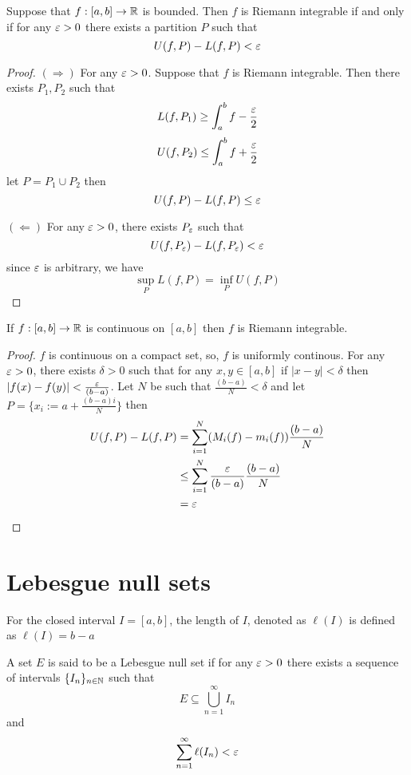 \begin{lemma}
  Suppose that $f: [a, b] \to \mathbb R$ is bounded. Then $f$ is Riemann integrable if and only if for any $\varepsilon > 0$ there exists a partition $P$ such that
  \[U(f, P) - L(f, P) < \varepsilon\]
\end{lemma}

\begin{proof}
  $(\Rightarrow)$ For any $\varepsilon > 0$. Suppose that $f$ is Riemann integrable. Then there exists $P_1, P_2$ such that
  \[L(f, P_1) \ge \int_a^b f - \frac{\varepsilon}{2}\]
  \[U(f, P_2) \le \int_a^b f + \frac{\varepsilon}{2}\]
  let $P = P_1 \cup P_2$ then
  \[U(f, P) - L(f, P) \le \varepsilon\]

  $(\Leftarrow)$ For any $\varepsilon > 0$, there exists $P_\varepsilon$ such that 
  \[U(f, P_\varepsilon) - L(f, P_\varepsilon) < \varepsilon\] since $\varepsilon$ is arbitrary, we have
  \[\sup_{P}L(f, P) = \inf_{P}U(f, P)\]
\end{proof}

\begin{theorem}
  If $f: [a, b]\to\mathbb R$ is continuous on $[a, b]$ then $f$ is Riemann integrable.
\end{theorem}


\begin{proof}
  $f$ is continuous on a compact set, so, $f$ is uniformly continous. For any $\varepsilon > 0$, there exists
  $\delta > 0$ such that for any $x, y \in [a, b]$ if $|x - y| < \delta$ then $|f(x) - f(y)| < \frac{\varepsilon}{(b-a)}$.
  Let $N$ be such that $\frac{(b-a)}{N} < \delta$ and let $P = \{x_i := a + \frac{(b-a)i}{N}\}$ then
  \begin{align*}
    U(f, P) - L(f, P) &= \sum_{i=1}^{N} (M_i(f) - m_i(f))\frac{(b-a)}{N}\\
    &\le \sum_{i=1}^{N} \frac{\varepsilon}{(b-a)}\frac{(b-a)}{N}\\
    &= \varepsilon
  \end{align*}
\end{proof}

\section{Lebesgue null sets}

\begin{definition}
  For the closed interval $I = [a, b]$, the length of $I$, denoted as $\ell(I)$ is defined as $\ell(I) = b - a$ 
\end{definition}

\begin{definition}
  A set $E$ is said to be a Lebesgue null set if for any $\varepsilon > 0$ there exists a sequence of intervals $\{I_n\}_{n\in\mathbb N}$ such that
  \[E \subseteq \bigcup_{n=1}^{\infty}I_n\]
  and
  \[\sum_{n=1}^{\infty}\ell(I_n) < \varepsilon\]
\end{definition}

